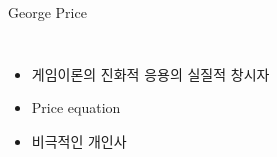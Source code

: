 \documentclass[final]{beamer}
\begin{document}
\begin{frame}[t]{George Price}
	\begin{columns}[c]
		\column{12em}
		\column{18em}
		\begin{itemize}
			\item 게임이론의 진화적 응용의 실질적 창시자 
			\item Price equation 
			\item 비극적인 개인사 
		\end{itemize}
	\end{columns}
\end{frame}
\end{document}
